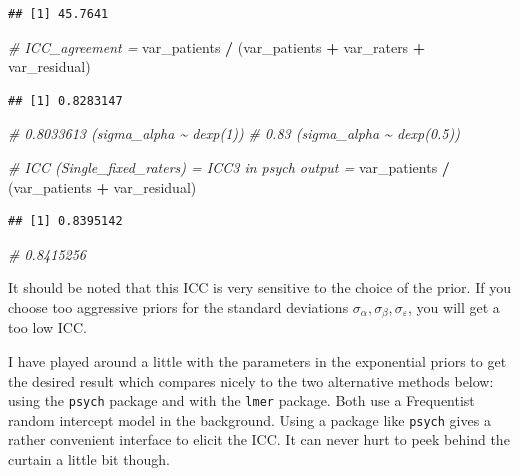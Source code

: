\documentclass[
]{book}
\newenvironment{Shaded}{\begin{snugshade}}{\end{snugshade}}
\newcommand{\CommentTok}[1]{\textcolor[rgb]{0.56,0.35,0.01}{\textit{#1}}}
\newcommand{\NormalTok}[1]{#1}
\newcommand{\SpecialCharTok}[1]{\textcolor[rgb]{0.81,0.36,0.00}{\textbf{#1}}}
\begin{document}
\begin{verbatim}
## [1] 45.7641
\end{verbatim}

\begin{Shaded}
\begin{Highlighting}[]
\CommentTok{\# ICC\_agreement = }
\NormalTok{var\_patients }\SpecialCharTok{/}\NormalTok{ (var\_patients }\SpecialCharTok{+}\NormalTok{ var\_raters }\SpecialCharTok{+}\NormalTok{ var\_residual)}
\end{Highlighting}
\end{Shaded}

\begin{verbatim}
## [1] 0.8283147
\end{verbatim}

\begin{Shaded}
\begin{Highlighting}[]
\CommentTok{\# 0.8033613 (sigma\_alpha \textasciitilde{} dexp(1))}
\CommentTok{\# 0.83 (sigma\_alpha \textasciitilde{} dexp(0.5))}

\CommentTok{\# ICC (Single\_fixed\_raters) = ICC3 in psych output = }
\NormalTok{var\_patients }\SpecialCharTok{/}\NormalTok{ (var\_patients }\SpecialCharTok{+}\NormalTok{ var\_residual)}
\end{Highlighting}
\end{Shaded}

\begin{verbatim}
## [1] 0.8395142
\end{verbatim}

\begin{Shaded}
\begin{Highlighting}[]
\CommentTok{\# 0.8415256}
\end{Highlighting}
\end{Shaded}

It should be noted that this ICC is very sensitive to the choice of the prior.
If you choose too aggressive priors for the standard deviations \(\sigma_{\alpha},
\sigma_{\beta}, \sigma_{\varepsilon}\), you will get a too low ICC.

I have played around a little with the parameters in the exponential priors
to get the desired result which compares nicely to the two alternative methods below:
using the \texttt{psych} package and with the \texttt{lmer}
package. Both use a Frequentist random intercept model in the background.
Using a package like \texttt{psych} gives a rather convenient interface to
elicit the ICC. It can never hurt to peek behind the curtain a little bit though.
\end{document}

